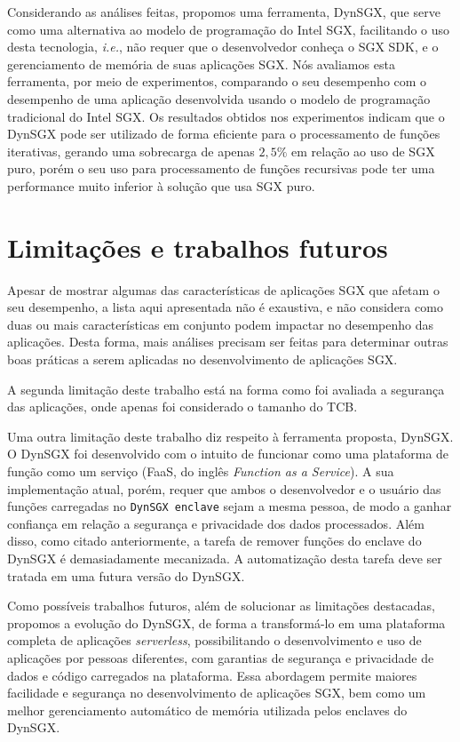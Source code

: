 Considerando as análises feitas, propomos uma ferramenta, DynSGX, que serve
como uma alternativa ao modelo de programação do Intel SGX, facilitando o uso
desta tecnologia, \textit{i.e.}, não requer que o desenvolvedor conheça o SGX
SDK, e o gerenciamento de memória de suas aplicações SGX. Nós avaliamos esta
ferramenta, por meio de experimentos, comparando o seu desempenho com o
desempenho de uma aplicação desenvolvida usando o modelo de programação
tradicional do Intel SGX. Os resultados obtidos nos experimentos indicam que
o DynSGX pode ser utilizado de forma eficiente para o processamento de funções
iterativas, gerando uma sobrecarga de apenas $2,5\%$ em relação ao uso de SGX
puro, porém o seu uso para processamento de funções recursivas pode ter
uma performance muito inferior à solução que usa SGX puro. 

\section{Limitações e trabalhos futuros}
\label{sec:conclusao_limitacoes_trabalhos_futuros}

Apesar de mostrar algumas das características de aplicações SGX que afetam o seu
desempenho, a lista aqui apresentada não é exaustiva, e não considera como duas
ou mais características em conjunto podem impactar no desempenho das aplicações.
Desta forma, mais análises precisam ser feitas para determinar outras boas
práticas a serem aplicadas no desenvolvimento de aplicações SGX.

A segunda limitação deste trabalho está na forma como foi avaliada a segurança
das aplicações, onde apenas foi considerado o tamanho do TCB.

Uma outra limitação deste trabalho diz respeito à ferramenta proposta, DynSGX.
O DynSGX foi desenvolvido com o intuito de funcionar como uma plataforma de
função como um serviço (FaaS, do inglês \textit{Function as a Service}). A sua
implementação atual, porém, requer que ambos o desenvolvedor e o usuário das
funções carregadas no \texttt{DynSGX enclave} sejam a mesma pessoa, de modo a
ganhar confiança em relação a segurança e privacidade dos dados processados.
Além disso, como citado anteriormente, a tarefa de remover funções do enclave do
DynSGX é demasiadamente mecanizada. A automatização desta tarefa deve ser
tratada em uma futura versão do DynSGX.

Como possíveis trabalhos futuros, além de solucionar as limitações destacadas,
propomos a evolução do DynSGX, de forma a transformá-lo em uma plataforma
completa de aplicações \textit{serverless}, possibilitando o desenvolvimento e
uso de aplicações por pessoas diferentes, com garantias de segurança e
privacidade de dados e código carregados na plataforma. Essa abordagem permite
maiores facilidade e segurança no desenvolvimento de aplicações SGX, bem como um
melhor gerenciamento automático de memória utilizada pelos enclaves do DynSGX.